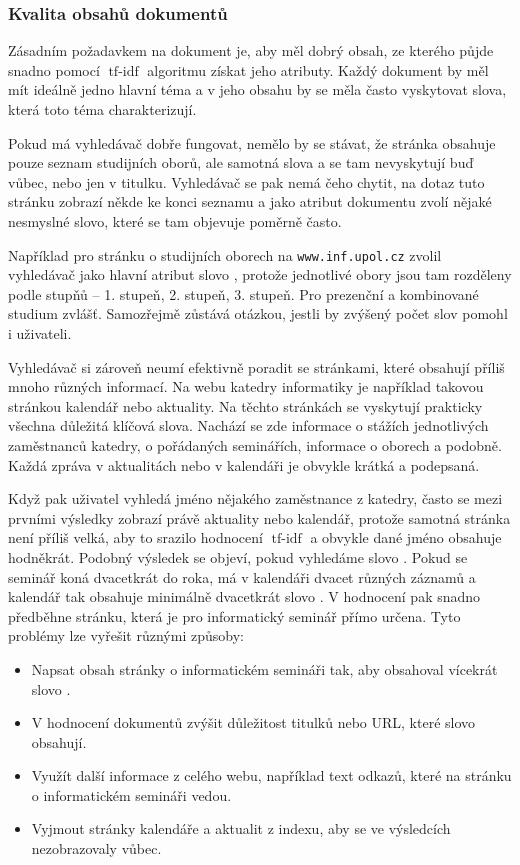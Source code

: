 \documentclass[12pt]{article}
\newcommand{\code}[1]{\texttt{#1}}
\newcommand{\sssection}[1]{\subsubsection{#1}}
\DeclareMathOperator{\tfidf}{tf-idf}
\begin{document}
\sssection{Kvalita obsahů dokumentů}\label{ch.kvalita}
Zásadním požadavkem na dokument je, aby měl dobrý obsah, ze kterého půjde snadno pomocí $\tfidf$ algoritmu získat jeho atributy. Každý dokument by měl mít ideálně jedno hlavní téma a v jeho obsahu by se měla často vyskytovat slova, která toto téma charakterizují. 

Pokud má vyhledávač dobře fungovat, nemělo by se stávat, že stránka  obsahuje pouze seznam studijních oborů, ale samotná slova  a  se tam nevyskytují buď vůbec, nebo jen v titulku. Vyhledávač se pak nemá čeho chytit, na dotaz  tuto stránku zobrazí někde ke konci seznamu a jako atribut dokumentu zvolí nějaké nesmyslné slovo, které se tam objevuje poměrně často. 

Například pro stránku o studijních oborech na \code{www.inf.upol.cz} zvolil vyhledávač jako hlavní atribut slovo , protože jednotlivé obory jsou tam rozděleny podle stupňů -- 1. stupeň, 2. stupeň, 3. stupeň. Pro prezenční a kombinované studium zvlášť. Samozřejmě zůstává otázkou, jestli by zvýšený počet slov  pomohl i uživateli. 

Vyhledávač si zároveň neumí efektivně poradit se stránkami, které obsahují příliš mnoho různých informací. Na webu katedry informatiky je například takovou stránkou kalendář nebo aktuality. Na těchto stránkách se vyskytují prakticky všechna důležitá klíčová slova. Nachází se zde informace o stážích jednotlivých zaměstnanců katedry, o pořádaných seminářích, informace o oborech a podobně. Každá zpráva v aktualitách nebo v kalendáři je obvykle krátká a podepsaná. 

Když pak uživatel vyhledá jméno nějakého zaměstnance z katedry, často se mezi prvními výsledky zobrazí právě aktuality nebo kalendář, protože samotná stránka není příliš velká, aby to srazilo hodnocení $\tfidf$ a obvykle dané jméno obsahuje hodněkrát. Podobný výsledek se objeví, pokud vyhledáme slovo . Pokud se seminář koná dvacetkrát do roka, má v kalendáři dvacet různých záznamů a kalendář tak obsahuje minimálně dvacetkrát slovo . V hodnocení pak snadno předběhne stránku, která je pro informatický seminář přímo určena. Tyto problémy lze vyřešit různými způsoby:

\begin{itemize}
	\item Napsat obsah stránky o informatickém semináři tak, aby obsahoval vícekrát slovo .
	\item V hodnocení dokumentů zvýšit důležitost titulků nebo URL, které slovo  obsahují. 
	\item Využít další informace z celého webu, například text odkazů, které na stránku o informatickém semináři vedou. 
	\item Vyjmout stránky kalendáře a aktualit z indexu, aby se ve výsledcích nezobrazovaly vůbec.
\end{itemize}
\end{document}

